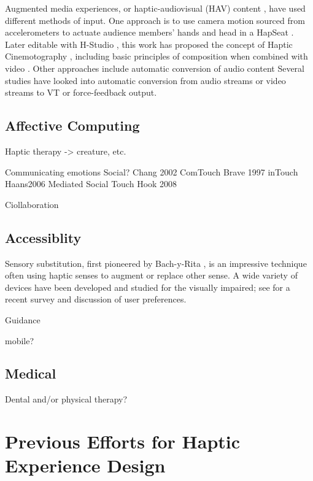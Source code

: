 Augmented media experiences, or haptic-audiovisual (HAV) content \cite{Danieau2013},  have used different methods of input.
One approach is to use camera motion sourced from accelerometers \cite{Danieau2012} to actuate audience members' hands and head in a HapSeat \cite{Danieau2013a,Danieau2012a}.
Later editable with H-Studio \cite{Danieau2013c}, this work has proposed the concept of Haptic Cinemotography \cite{Danieau2014}, including basic principles of composition when combined with video \cite{Guillotel2016}.
Other approaches include automatic conversion of audio content
Several studies have looked into automatic conversion from audio streams \cite{Lee2013,Chang2005,Hwang2014} or video streams \cite{Kim2014} to VT or force-feedback output.



\subsection{Affective Computing}
Haptic therapy -> creature, etc.
\cite{Yohanan2005,Yohanan2009,Yohanan2011,Yohanan2011}


Communicating emotions
Social?
Chang 2002 ComTouch
Brave 1997 inTouch
Haans2006 Mediated Social Touch
Hook 2008

Ciollaboration


\subsection{Accessiblity}
Sensory substitution, first pioneered by Bach-y-Rita \cite{Bach-y-Rita1969}, is an impressive technique often using haptic senses to augment or replace other sense.
A wide variety of devices have been developed and studied for the visually impaired; see \citep{Hamilton-Fletcher2016} for a recent survey and discussion of user preferences.

Guidance

mobile?


\subsection{Medical}
Dental and/or physical therapy?



%
%
\section{Previous Efforts for Haptic Experience Design}


